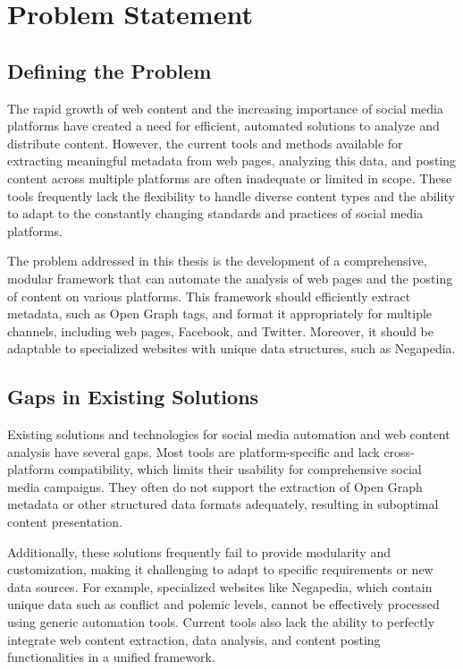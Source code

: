 \section{Problem Statement}
\label{sec:problem_statement}

\subsection{Defining the Problem}
\label{sec:defining_the_problem}
The rapid growth of web content and the increasing importance of social media platforms have created a need for efficient, automated solutions to analyze and distribute content. However, the current tools and methods available for extracting meaningful metadata from web pages, analyzing this data, and posting content across multiple platforms are often inadequate or limited in scope. These tools frequently lack the flexibility to handle diverse content types and the ability to adapt to the constantly changing standards and practices of social media platforms.

The problem addressed in this thesis is the development of a comprehensive, modular framework that can automate the analysis of web pages and the posting of content on various platforms. This framework should efficiently extract metadata, such as Open Graph tags, and format it appropriately for multiple channels, including web pages, Facebook, and Twitter. Moreover, it should be adaptable to specialized websites with unique data structures, such as Negapedia.

\subsection{Gaps in Existing Solutions}
\label{sec:gaps_in_existing_solutions}
Existing solutions and technologies for social media automation and web content analysis have several gaps. Most tools are platform-specific and lack cross-platform compatibility, which limits their usability for comprehensive social media campaigns. They often do not support the extraction of Open Graph metadata or other structured data formats adequately, resulting in suboptimal content presentation.

Additionally, these solutions frequently fail to provide modularity and customization, making it challenging to adapt to specific requirements or new data sources. For example, specialized websites like Negapedia, which contain unique data such as conflict and polemic levels, cannot be effectively processed using generic automation tools. Current tools also lack the ability to perfectly integrate web content extraction, data analysis, and content posting functionalities in a unified framework.

